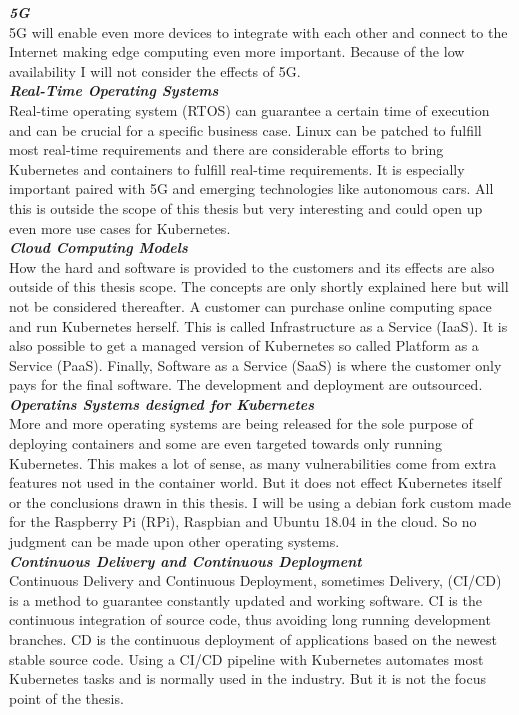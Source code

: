 \textbf{\textit{5G}}\\
5G will enable even more devices to integrate with each other and connect to the Internet making edge computing even more important. Because of the low availability I will not consider the effects of 5G.\\[5mm]
\textbf{\textit{Real-Time Operating Systems}}\\
Real-time operating system (RTOS) can guarantee a certain time of execution and can be crucial for a specific business case. Linux can be patched to fulfill most real-time requirements and there are considerable efforts to bring Kubernetes and containers to fulfill real-time requirements. It is especially important paired with 5G and emerging technologies like autonomous cars\cite{CNCFLaunRTOSKubernetesContainers40:online}. All this is outside the scope of this thesis but very interesting and could open up even more use cases for Kubernetes.\\[5mm]
\clearpage
\noindent\textbf{\textit{Cloud Computing Models}}\\
How the hard and software is provided to the customers and its effects are also outside of this thesis scope. The concepts are only shortly explained here but will not be considered thereafter. A customer can purchase online computing space and run Kubernetes herself. This is called Infrastructure as a Service (IaaS). It is also possible to get a managed version of Kubernetes so called Platform as a Service (PaaS). Finally, Software as a Service (SaaS) is where the customer only pays for the final software. The development and deployment are outsourced.\\[5mm]
\textbf{\textit{Operatins Systems designed for Kubernetes}}\\
More and more operating systems are being released for the sole purpose of deploying containers and some are even targeted towards only running Kubernetes. This makes a lot of sense, as many vulnerabilities come from extra features not used in the container world. But it does not effect Kubernetes itself or the conclusions drawn in this thesis. I will be using a debian fork custom made for the Raspberry Pi (RPi), Raspbian and Ubuntu 18.04 in the cloud. So no judgment can be made upon other operating systems.\\[5mm]
\textbf{\textit{Continuous Delivery and Continuous Deployment}}\\
Continuous Delivery and Continuous Deployment, sometimes Delivery, (CI/CD) is a method to guarantee constantly updated and working software. CI is the continuous integration of source code, thus avoiding long running development branches. CD is the continuous deployment of applications based on the newest stable source code. Using a CI/CD pipeline with Kubernetes automates most Kubernetes tasks and is normally used in the industry. But it is not the focus point of the thesis.



